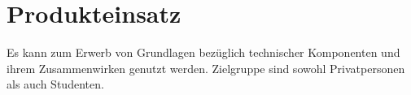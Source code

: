 
\section{Produkteinsatz}


Es kann zum Erwerb von Grundlagen bezüglich technischer Komponenten und ihrem Zusammenwirken genutzt werden. Zielgruppe sind sowohl Privatpersonen als auch Studenten.